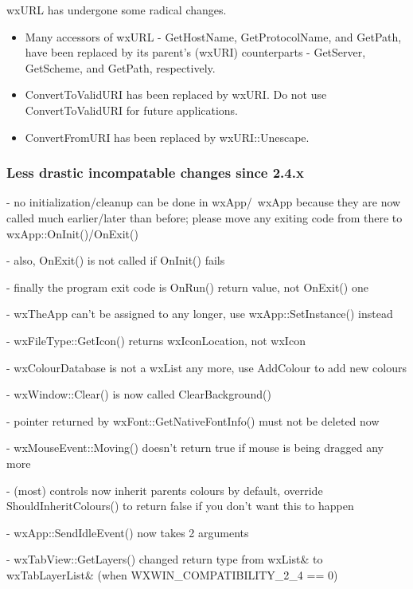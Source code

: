 wxURL has undergone some radical changes.

\begin{itemize}\itemsep=0pt
\item Many accessors of wxURL - GetHostName, GetProtocolName, and GetPath,
      have been replaced by its parent's (wxURI) counterparts - GetServer,
      GetScheme, and GetPath, respectively.

\item ConvertToValidURI has been replaced by wxURI.  Do not use
      ConvertToValidURI for future applications.

\item ConvertFromURI has been replaced by wxURI::Unescape.
\end{itemize}



\subsubsection{Less drastic incompatable changes since 2.4.x}\label{24incompatiblelessdrastic}

- no initialization/cleanup can be done in wxApp/~wxApp because they are
  now called much earlier/later than before; please move any exiting code
  from there to wxApp::OnInit()/OnExit()

- also, OnExit() is not called if OnInit() fails

- finally the program exit code is OnRun() return value, not OnExit() one

- wxTheApp can't be assigned to any longer, use wxApp::SetInstance() instead

- wxFileType::GetIcon() returns wxIconLocation, not wxIcon

- wxColourDatabase is not a wxList any more, use AddColour to add new colours

- wxWindow::Clear() is now called ClearBackground()

- pointer returned by wxFont::GetNativeFontInfo() must not be deleted now

- wxMouseEvent::Moving() doesn't return true if mouse is being dragged any more

- (most) controls now inherit parents colours by default, override
  ShouldInheritColours() to return false if you don't want this to happen

- wxApp::SendIdleEvent() now takes 2 arguments

- wxTabView::GetLayers() changed return type from wxList& to wxTabLayerList&
  (when WXWIN\_COMPATIBILITY\_2\_4 == 0)

